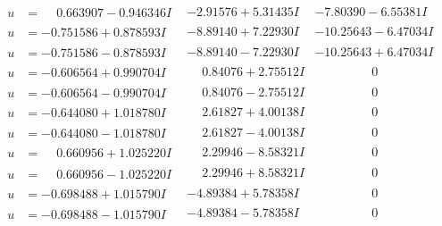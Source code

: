 \documentclass[1p]{elsarticle_modified}
\theoremstyle{definition}
\begin{document}
$$\begin{array}{c|c|c}
\begin{aligned}
u &= \phantom{-}0.663907 - 0.946346 I\end{aligned}
 & -2.91576 + 5.31435 I & -7.80390 - 6.55381 I \\ \hline\begin{aligned}
u &= -0.751586 + 0.878593 I\end{aligned}
 & -8.89140 + 7.22930 I & -10.25643 - 6.47034 I \\ \hline\begin{aligned}
u &= -0.751586 - 0.878593 I\end{aligned}
 & -8.89140 - 7.22930 I & -10.25643 + 6.47034 I \\ \hline\begin{aligned}
u &= -0.606564 + 0.990704 I\end{aligned}
 & \phantom{-}0.84076 + 2.75512 I & \phantom{-0.000000 } 0 \\ \hline\begin{aligned}
u &= -0.606564 - 0.990704 I\end{aligned}
 & \phantom{-}0.84076 - 2.75512 I & \phantom{-0.000000 } 0 \\ \hline\begin{aligned}
u &= -0.644080 + 1.018780 I\end{aligned}
 & \phantom{-}2.61827 + 4.00138 I & \phantom{-0.000000 } 0 \\ \hline\begin{aligned}
u &= -0.644080 - 1.018780 I\end{aligned}
 & \phantom{-}2.61827 - 4.00138 I & \phantom{-0.000000 } 0 \\ \hline\begin{aligned}
u &= \phantom{-}0.660956 + 1.025220 I\end{aligned}
 & \phantom{-}2.29946 - 8.58321 I & \phantom{-0.000000 } 0 \\ \hline\begin{aligned}
u &= \phantom{-}0.660956 - 1.025220 I\end{aligned}
 & \phantom{-}2.29946 + 8.58321 I & \phantom{-0.000000 } 0 \\ \hline\begin{aligned}
u &= -0.698488 + 1.015790 I\end{aligned}
 & -4.89384 + 5.78358 I & \phantom{-0.000000 } 0 \\ \hline\begin{aligned}
u &= -0.698488 - 1.015790 I\end{aligned}
 & -4.89384 - 5.78358 I & \phantom{-0.000000 } 0 \\ \hline\begin{aligned}

\end{aligned}
\end{array}$$
\end{document}
